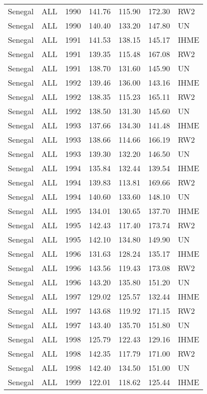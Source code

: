 \begin{longtable}{lllrrrl}
  Senegal & ALL & 1990 & 141.76 & 115.90 & 172.30 & RW2 \\ 
  Senegal & ALL & 1990 & 140.40 & 133.20 & 147.80 & UN \\ 
  Senegal & ALL & 1991 & 141.53 & 138.15 & 145.17 & IHME \\ 
  Senegal & ALL & 1991 & 139.35 & 115.48 & 167.08 & RW2 \\ 
  Senegal & ALL & 1991 & 138.70 & 131.60 & 145.90 & UN \\ 
  Senegal & ALL & 1992 & 139.46 & 136.00 & 143.16 & IHME \\ 
  Senegal & ALL & 1992 & 138.35 & 115.23 & 165.11 & RW2 \\ 
  Senegal & ALL & 1992 & 138.50 & 131.30 & 145.60 & UN \\ 
  Senegal & ALL & 1993 & 137.66 & 134.30 & 141.48 & IHME \\ 
  Senegal & ALL & 1993 & 138.66 & 114.66 & 166.19 & RW2 \\ 
  Senegal & ALL & 1993 & 139.30 & 132.20 & 146.50 & UN \\ 
  Senegal & ALL & 1994 & 135.84 & 132.44 & 139.54 & IHME \\ 
  Senegal & ALL & 1994 & 139.83 & 113.81 & 169.66 & RW2 \\ 
  Senegal & ALL & 1994 & 140.60 & 133.60 & 148.10 & UN \\ 
  Senegal & ALL & 1995 & 134.01 & 130.65 & 137.70 & IHME \\ 
  Senegal & ALL & 1995 & 142.43 & 117.40 & 173.74 & RW2 \\ 
  Senegal & ALL & 1995 & 142.10 & 134.80 & 149.90 & UN \\ 
  Senegal & ALL & 1996 & 131.63 & 128.24 & 135.17 & IHME \\ 
  Senegal & ALL & 1996 & 143.56 & 119.43 & 173.08 & RW2 \\ 
  Senegal & ALL & 1996 & 143.20 & 135.80 & 151.20 & UN \\ 
  Senegal & ALL & 1997 & 129.02 & 125.57 & 132.44 & IHME \\ 
  Senegal & ALL & 1997 & 143.68 & 119.92 & 171.15 & RW2 \\ 
  Senegal & ALL & 1997 & 143.40 & 135.70 & 151.80 & UN \\ 
  Senegal & ALL & 1998 & 125.79 & 122.43 & 129.16 & IHME \\ 
  Senegal & ALL & 1998 & 142.35 & 117.79 & 171.00 & RW2 \\ 
  Senegal & ALL & 1998 & 142.40 & 134.50 & 151.00 & UN \\ 
  Senegal & ALL & 1999 & 122.01 & 118.62 & 125.44 & IHME \\ 

\end{longtable}
